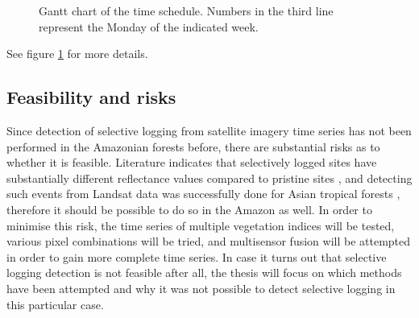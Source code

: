 \documentclass[a4paper,10pt]{article}
\begin{document}
\begin{figure}
  \caption{Gantt chart of the time schedule. Numbers in the third line represent the Monday of the indicated week.}
  \label{fig-gantt}
\end{figure}

See figure \ref{fig-gantt} for more details.

\subsection{Feasibility and risks}

Since detection of selective logging from satellite imagery time series has not been performed in the Amazonian forests before, there are substantial risks as to whether it is feasible. Literature indicates that selectively logged sites have substantially different reflectance values compared to pristine sites \citep{broadbent_recovery_2006}, and detecting such events from Landsat data was successfully done for Asian tropical forests \citep{shimizu_using_2017}, therefore it should be possible to do so in the Amazon as well. In order to minimise this risk, the time series of multiple vegetation indices will be tested, various pixel combinations will be tried, and multisensor fusion will be attempted in order to gain more complete time series. In case it turns out that selective logging detection is not feasible after all, the thesis will focus on which methods have been attempted and why it was not possible to detect selective logging in this particular case.
\end{document}
